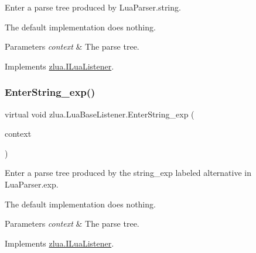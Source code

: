 Enter a parse tree produced by Lua\+Parser.\+string. 

The default implementation does nothing.


\begin{DoxyParams}{Parameters}
{\em context} & The parse tree.\\
\hline
\end{DoxyParams}


Implements \mbox{\hyperlink{interfacezlua_1_1_i_lua_listener_a47729a5ed96c8b8310250fae283584ec}{zlua.\+I\+Lua\+Listener}}.

\mbox{\label{classzlua_1_1_lua_base_listener_aba9f9054eb0fce5f9e2108c03098b28a}} 
\subsubsection{\texorpdfstring{Enter\+String\+\_\+exp()}{EnterString\_exp()}}
{\footnotesize\ttfamily virtual void zlua.\+Lua\+Base\+Listener.\+Enter\+String\+\_\+exp (\begin{DoxyParamCaption}\item[{\mbox{[}\+Not\+Null\mbox{]} \mbox{\hyperlink{classzlua_1_1_lua_parser_1_1_string__exp_context}{Lua\+Parser.\+String\+\_\+exp\+Context}}}]{context }\end{DoxyParamCaption})\hspace{0.3cm}{\ttfamily [virtual]}}



Enter a parse tree produced by the {\ttfamily string\+\_\+exp} labeled alternative in Lua\+Parser.\+exp. 

The default implementation does nothing.


\begin{DoxyParams}{Parameters}
{\em context} & The parse tree.\\
\hline
\end{DoxyParams}


Implements \mbox{\hyperlink{interfacezlua_1_1_i_lua_listener_a8e9361d3a88bf9fe02b6be1b7aa3f066}{zlua.\+I\+Lua\+Listener}}.

\mbox{\label{classzlua_1_1_lua_base_listener_ae6df0ff428e128a61cef144061a8747b}} 
